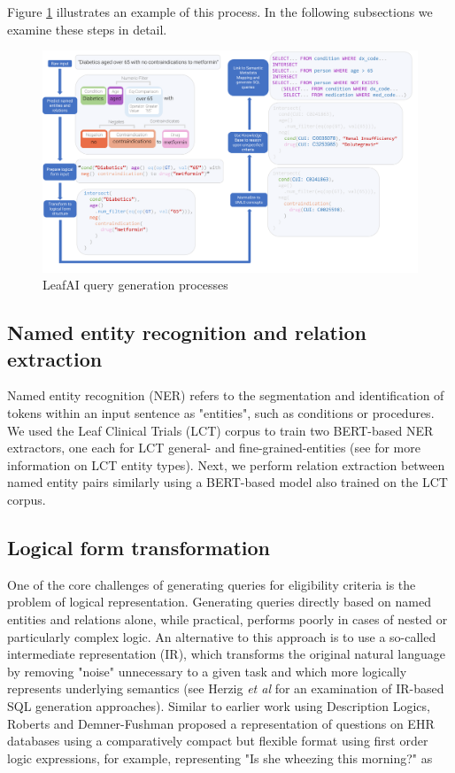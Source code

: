 \documentclass[../main.tex]{subfiles}
\begin{document}
\noindent Figure \ref{fig_leafai_querygen} illustrates an example of this process. In the following subsections we examine these steps in detail.

\begin{figure}[h]
  \includegraphics[scale=0.46]{Figures/7_query_generation/leafai_flow.pdf}  
\caption{LeafAI query generation processes}
\label{fig_leafai_querygen}
\end{figure}

\subsection{Named entity recognition and relation extraction}

\noindent Named entity recognition (NER) refers to the segmentation and identification of tokens within an input sentence as "entities", such as conditions or procedures. We used the Leaf Clinical Trials (LCT) corpus \cite{dobbins2022leaf} to train two BERT-based \cite{devlin2018bert} NER extractors, one each for LCT general- and fine-grained-entities (see \cite{dobbins2022leaf} for more information on LCT entity types). Next, we perform relation extraction between named entity pairs similarly using a BERT-based model also trained on the LCT corpus.

\subsection{Logical form transformation}

One of the core challenges of generating queries for eligibility criteria is the problem of logical representation. Generating queries directly based on named entities and relations alone, while practical, performs poorly in cases of nested or particularly complex logic. An alternative to this approach is to use a so-called intermediate representation (IR), which transforms the original natural language by removing "noise" unnecessary to a given task and which more logically represents underlying semantics (see Herzig \textit{et al} \cite{herzig2021unlocking} for an examination of IR-based SQL generation approaches). Similar to earlier work using Description Logics, Roberts and Demner-Fushman \cite{roberts2016annotating} proposed a representation of questions on EHR databases using a comparatively compact but flexible format using first order logic expressions, for example, representing "Is she wheezing this morning?" as
\end{document}
